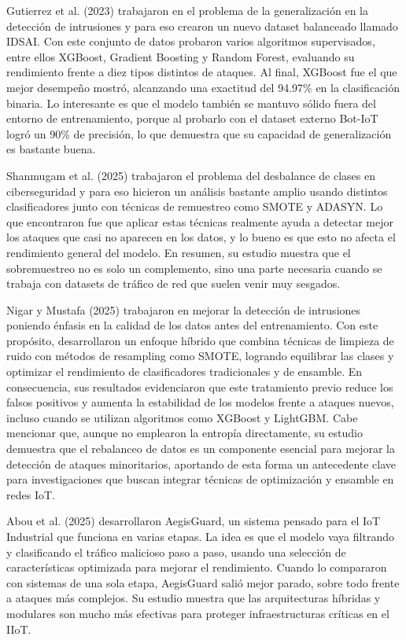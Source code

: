 Gutierrez et al. (2023) trabajaron en el problema de la generalización en la detección de intrusiones y para eso crearon un nuevo dataset balanceado llamado IDSAI. Con este conjunto de datos probaron varios algoritmos supervisados, entre ellos XGBoost, Gradient Boosting y Random Forest, evaluando su rendimiento frente a diez tipos distintos de ataques. Al final, XGBoost fue el que mejor desempeño mostró, alcanzando una exactitud del 94.97\% en la clasificación binaria. Lo interesante es que el modelo también se mantuvo sólido fuera del entorno de entrenamiento, porque al probarlo con el dataset externo Bot-IoT logró un 90\% de precisión, lo que demuestra que su capacidad de generalización es bastante buena.

Shanmugam et al. (2025) trabajaron el problema del desbalance de clases en ciberseguridad y para eso hicieron un análisis bastante amplio usando distintos clasificadores junto con técnicas de remuestreo como SMOTE y ADASYN. Lo que encontraron fue que aplicar estas técnicas realmente ayuda a detectar mejor los ataques que casi no aparecen en los datos, y lo bueno es que esto no afecta el rendimiento general del modelo. En resumen, su estudio muestra que el sobremuestreo no es solo un complemento, sino una parte necesaria cuando se trabaja con datasets de tráfico de red que suelen venir muy sesgados.

Nigar y Mustafa (2025) trabajaron en mejorar la detección de intrusiones poniendo énfasis en la calidad de los datos antes del entrenamiento. Con este propósito, desarrollaron un enfoque híbrido que combina técnicas de limpieza de ruido con métodos de resampling como SMOTE, logrando equilibrar las clases y optimizar el rendimiento de clasificadores tradicionales y de ensamble. En consecuencia, sus resultados evidenciaron que este tratamiento previo reduce los falsos positivos y aumenta la estabilidad de los modelos frente a ataques nuevos, incluso cuando se utilizan algoritmos como XGBoost y LightGBM. Cabe mencionar que, aunque no emplearon la entropía directamente, su estudio demuestra que el rebalanceo de datos es un componente esencial para mejorar la detección de ataques minoritarios, aportando de esta forma un antecedente clave para investigaciones que buscan integrar técnicas de optimización y ensamble en redes IoT.

Abou et al. (2025) desarrollaron AegisGuard, un sistema pensado para el IoT Industrial que funciona en varias etapas. La idea es que el modelo vaya filtrando y clasificando el tráfico malicioso paso a paso, usando una selección de características optimizada para mejorar el rendimiento. Cuando lo compararon con sistemas de una sola etapa, AegisGuard salió mejor parado, sobre todo frente a ataques más complejos. Su estudio muestra que las arquitecturas híbridas y modulares son mucho más efectivas para proteger infraestructuras críticas en el IIoT.

